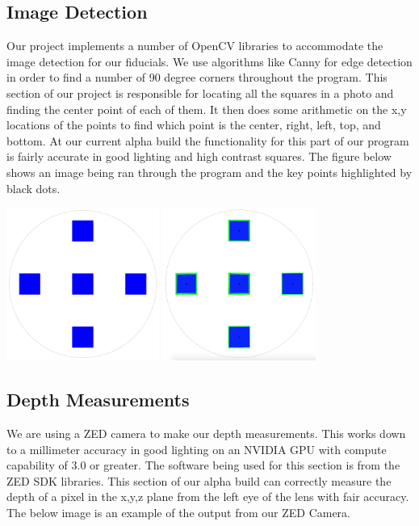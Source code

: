 \documentclass[onecolumn, draftclsnofoot,10pt, compsoc]{IEEEtran}
\begin{document}
\subsection{Image Detection}
Our project implements a number of OpenCV libraries to accommodate the image detection for our fiducials.  We use algorithms like Canny for edge detection in order to find a number of 90 degree corners throughout the program.  This section of our project is responsible for locating all the squares in a photo and finding the center point of each of them.  It then does some arithmetic on the x,y locations of the points to find which point is the center, right, left, top, and bottom.  At our current alpha build the functionality for this part of our program is fairly accurate in good lighting and high contrast squares.  The figure below shows an image being ran through the program and the key points highlighted by black dots.

\includegraphics[width=5cm, height=5cm]{images/alphafiducial.jpg}
\includegraphics[width=5cm, height=5cm]{images/marked.png}

\subsection{Depth Measurements}
We are using a ZED camera to make our depth measurements.  This works down to a millimeter accuracy in good lighting on an NVIDIA GPU with compute capability of 3.0 or greater.  The software being used for this section is from the ZED SDK libraries.  This section of our alpha build can correctly measure the depth of a pixel in the x,y,z plane from the left eye of the lens with fair accuracy.  The below image is an example of the output from our ZED Camera.
\end{document}
